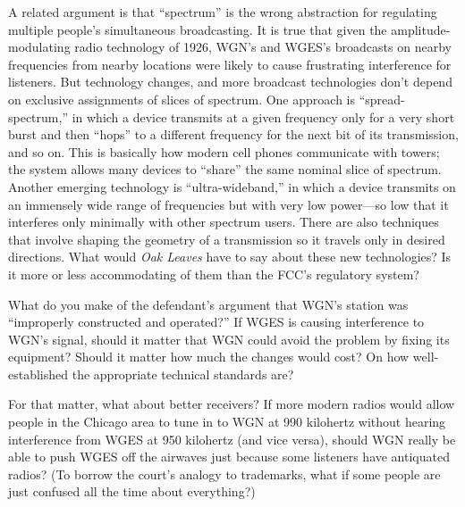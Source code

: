 A related argument is that ``spectrum'' is the wrong abstraction for regulating
multiple people's simultaneous broadcasting. It is true that given the
amplitude-modulating radio technology of 1926, WGN's and WGES's broadcasts on
nearby frequencies from nearby locations were likely to cause frustrating
interference for listeners. But technology changes, and more broadcast
technologies don't depend on exclusive assignments of slices of spectrum. One
approach is ``spread-spectrum,'' in which a device transmits at a given
frequency only for a very short burst and then ``hops'' to a different
frequency for the next bit of its transmission, and so on. This is basically
how modern cell phones communicate with towers; the system allows many devices
to ``share'' the same nominal slice of spectrum. Another emerging technology is
``ultra-wideband,'' in which a device transmits on an immensely wide range of
frequencies but with very low power---so low that it interferes only minimally
with other spectrum users. There are also techniques that involve shaping the
geometry of a transmission so it travels only in desired directions. What would
\textit{Oak Leaves} have to say about these new technologies? Is it more or
less accommodating of them than the FCC's regulatory system?

\item What do you make of the defendant's argument that WGN's station was
``improperly constructed and operated?'' If WGES is causing interference to
WGN's signal, should it matter that WGN could avoid the problem by fixing its
equipment? Should it matter how much the changes would cost? On how
well-established the appropriate technical standards are?

For that matter, what about better receivers? If more modern radios would allow
people in the Chicago area to tune in to WGN at 990 kilohertz without hearing
interference from WGES at 950 kilohertz (and vice versa), should WGN really be
able to push WGES off the airwaves just because some listeners have antiquated
radios? (To borrow the court's analogy to trademarks, what if some people are
just confused all the time about everything?)

